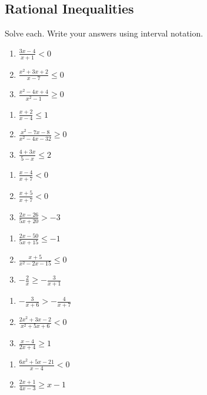 \subsection*{Rational Inequalities}
Solve each. Write your answers using interval notation.
\begin{multicols}{3}
\begin{enumerate}	\setcounter{Review}{\value{enumi}}
\setlength\itemsep{10pt}
\item $\frac{3x-4}{x+1}<0$
\item $\frac{x^2+3x+2}{x-7} \leq 0$
\item $\frac{x^2-4x+4}{x^2-1} \geq 0$
\end{enumerate} \setcounter{Review}{\value{enumi}}
\end{multicols}
\begin{multicols}{3}
\begin{enumerate}	\setcounter{enumi}{\value{Review}}
\item $\frac{x+2}{x-4} \leq 1$
\item $\frac{x^2-7x-8}{x^2-4x-32} \geq 0$
\item $\frac{4+3x}{5-x} \leq 2$
\end{enumerate} \setcounter{Review}{\value{enumi}}
\end{multicols}
\begin{multicols}{3}
\begin{enumerate}	\setcounter{enumi}{\value{Review}}
\item $\frac{x-4}{x+7} < 0$
\item $\frac{x+5}{x+7} < 0$
\item $\frac{2x-26}{5x+20} > -3$
\end{enumerate} \setcounter{Review}{\value{enumi}}
\end{multicols}
\begin{multicols}{3}
\begin{enumerate}	\setcounter{enumi}{\value{Review}}
\item $\frac{2x-50}{5x+15} \leq -1$
\item $\frac{x+5}{x^2-2x-15} \leq 0$
\item $-\frac{2}{x} \geq - \frac{3}{x+1}$
\end{enumerate} \setcounter{Review}{\value{enumi}}
\end{multicols}
\begin{multicols}{3}
\begin{enumerate}	\setcounter{enumi}{\value{Review}}
\item $-\frac{3}{x+6} > -\frac{4}{x+7}$
\item $\frac{2x^2+3x-2}{x^2+5x+6} < 0$
\item $\frac{x-4}{2x+4} \geq 1$
\end{enumerate}	\setcounter{Review}{\value{enumi}}
\end{multicols}
\begin{multicols}{3}
\begin{enumerate}	\setcounter{enumi}{\value{Review}}
\item $\frac{6x^2+5x-21}{x-4} < 0$
\item $\frac{2x+1}{4x-3} \geq x-1$
\end{enumerate}	\setcounter{Review}{\value{enumi}}
\end{multicols}

